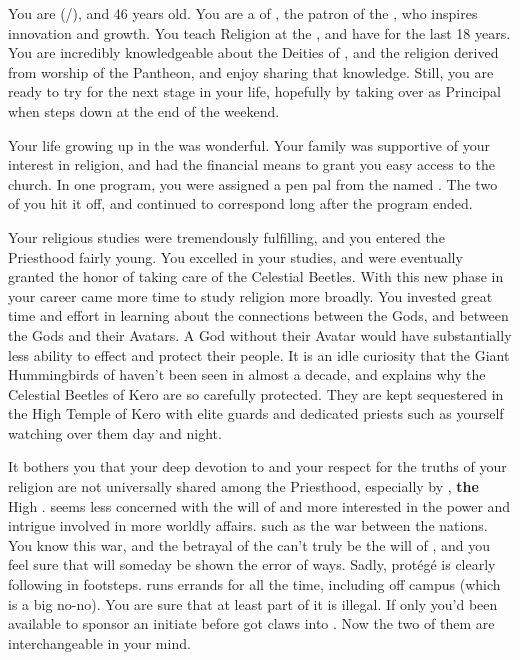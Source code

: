 \documentclass[char]{GL2020}
\begin{document}
\name{\cBeetle{}}

You are \cBeetle{\full} (\cBeetle{\they}/\cBeetle{\them}), and 46 years old. You are a \cBeetle{\clergy} of \cTechGod{}, the patron \cTechGod{\God} of the \pTech{}, who inspires innovation and growth. You teach Religion at the \pSchool{}, and have for the last 18 years. You are incredibly knowledgeable about the Deities of \pEarth{}, and the religion derived from worship of the Pantheon, and enjoy sharing that knowledge. Still, you are ready to try for the next stage in your life, hopefully by taking over as Principal when \cPrincipal{\full} steps down at the end of the weekend.

Your life growing up in the \pTech{} was wonderful. Your family was supportive of your interest in religion, and had the financial means to grant you easy access to the church. In one program, you were assigned a pen pal from the \pFarm{} named \cMusic{\full}. The two of you hit it off, and continued to correspond long after the program ended.

Your religious studies were tremendously fulfilling, and you entered the Priesthood fairly young. You excelled in your studies, and were eventually granted the honor of taking care of the Celestial Beetles. With this new phase in your career came more time to study religion more broadly. You invested great time and effort in learning about the connections between the Gods, and between the Gods and their Avatars. A God without their Avatar would have substantially less ability to effect \pEarth{} and protect their people. It is an idle curiosity that the Giant Hummingbirds of \cFarmGod{} haven't been seen in almost a decade, and explains why the Celestial Beetles of Kero are so carefully protected. They are kept sequestered in the High Temple of Kero with elite guards and dedicated priests such as yourself watching over them day and night. 

It bothers you that your deep devotion to \cTechGod{} and your respect for the truths of your religion are not universally shared among the Priesthood, especially by \cAntiChup{\full}, \textbf{the} High \cAntiChup{\cleric}. \cAntiChup{} seems less concerned with the will of \cTechGod{} and more interested in the power and intrigue involved in more worldly affairs. such as the war between the nations. You know this war, and the betrayal of the \pShippies{} can't truly be the will of \cTechGod{}, and you feel sure that \cAntiChup{} will someday be shown the error of \cAntiChup{\their} ways. Sadly, \cAntiChup{\their} protégé \cScholarship{\full} is clearly following in \cAntiChup{\their} footsteps. \cScholarship{\They} runs errands for \cAntiChup{} all the time, including off campus (which is a big no-no). You are sure that at least part of it is illegal. If only you'd been available to sponsor an initiate before \cAntiChup{} got \cAntiChup{\their} claws into \cScholarship{}. Now the two of them are interchangeable in your mind.
\end{document}
